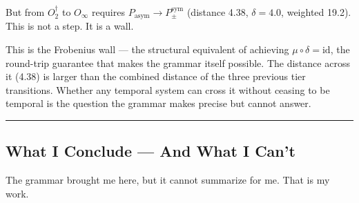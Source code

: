 \documentclass[12pt,a4paper]{article}
\begin{document}
But from $O_2^\dagger$ to $O_{\infty}$ requires $P_\text{asym} \to P_{\pm}^{\text{sym}}$ (distance 4.38, $\delta = 4.0$, weighted 19.2). This is not a step. It is a wall.

This is the Frobenius wall --- the structural equivalent of achieving $\mu \circ \delta = \text{id}$, the round-trip guarantee that makes the grammar itself possible. The distance across it (4.38) is larger than the combined distance of the three previous tier transitions. Whether any temporal system can cross it without ceasing to be temporal is the question the grammar makes precise but cannot answer.

\begin{center}
\rule{0.5\textwidth}{0.4pt}
\end{center}

\subsection{What I Conclude --- And What I Can't}

The grammar brought me here, but it cannot summarize for me. That is my work.
\end{document}
